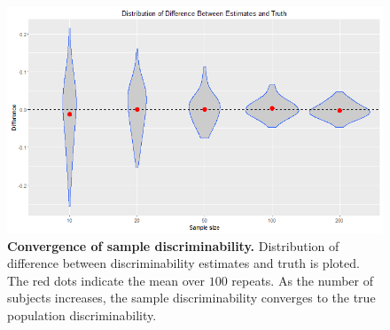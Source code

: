 \documentclass{article}
\begin{document}
\begin{figure}[ht!]
	\includegraphics[width=\linewidth]{../Figs/rel_conv.png}
	\caption{{\bf Convergence of sample discriminability.} Distribution of difference between discriminability estimates and truth is ploted. The red dots indicate the mean over $100$ repeats. As the number of subjects increases, the sample discriminability converges to the true population discriminability. }
	\label{fig:conv}
\end{figure}
\end{document}
